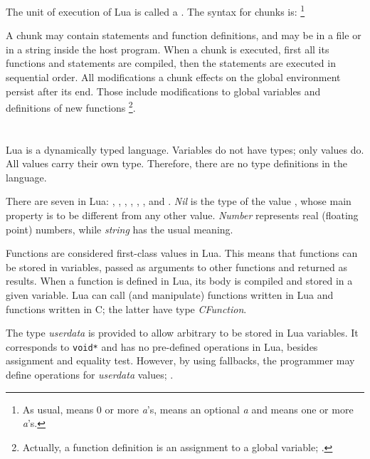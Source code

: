 The unit of execution of Lua is called a .
The syntax for chunks is:%
\footnote{As usual,  means 0 or more {\em a\/}'s,
 means an optional {\em a} and  means
one or more {\em a\/}'s.}
\begin{Produc}
\end{Produc}%
A chunk may contain statements and function definitions,
and may be in a file or in a string inside the host program.
When a chunk is executed, first all its functions and statements are compiled,
then the statements are executed in sequential order.
All modifications a chunk effects on the global environment persist
after its end.
Those include modifications to global variables and definitions
of new functions%
\footnote{Actually, a function definition is an
assignment to a global variable; .}.



\section{} \label{TypesSec}

Lua is a dynamically typed language.
Variables do not have types; only values do.
All values carry their own type.
Therefore, there are no type definitions in the language.

There are seven  in Lua: , ,
, , , ,
and .
{\em Nil} is the type of the value \nil,
whose main property is to be different from any other value.
{\em Number} represents real (floating point) numbers,
while {\em string} has the usual meaning.

Functions are considered first-class values in Lua.
This means that functions can be stored in variables,
passed as arguments to other functions and returned as results.
When a function is defined in Lua, its body is compiled and stored
in a given variable.
Lua can call (and manipulate) functions written in Lua and
functions written in C; the latter have type {\em CFunction\/}.

The type {\em userdata} is provided to allow
arbitrary  to be stored in Lua variables.
It corresponds to \verb'void*' and has no pre-defined operations in Lua,
besides assignment and equality test.
However, by using fallbacks, the programmer may define operations
for {\em userdata} values; .

